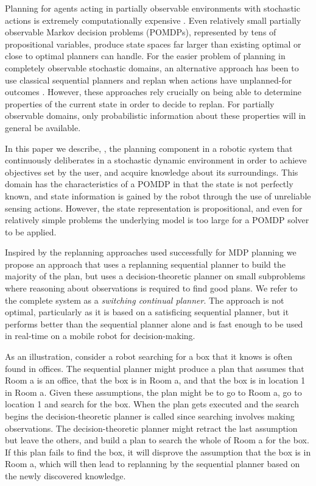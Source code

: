

Planning for agents acting in partially observable environments with
stochastic actions is extremely computationally
expensive \cite{mdp-complexity}. Even relatively small partially
observable Markov decision problems (POMDPs), represented by tens of
propositional variables, produce state spaces far larger than existing
optimal or close to optimal planners can handle. For the easier
problem of planning in completely observable stochastic domains, an
alternative approach has been to use classical sequential planners and
replan when actions have unplanned-for
outcomes \cite{yoon:etal:2007}. However, these approaches rely
crucially on being able to determine properties of the current state
in order to decide to replan. For partially observable domains, only
probabilistic information about these properties will in general be
available.

In this paper we describe, \pcogx, the planning component in a robotic
system that continuously deliberates in a stochastic dynamic
environment in order to achieve objectives set by the user, and
acquire knowledge about its surroundings. This domain has the
characteristics of a POMDP in that the state is not perfectly known,
and state information is gained by the robot through the use of
unreliable sensing actions. However, the state representation is
propositional, and even for relatively simple problems the underlying
model is too large for a POMDP solver to be applied.

Inspired by the replanning approaches used successfully for MDP
planning \cite{yoon:etal:2007,yoon:etal:2008} we propose an approach
that uses a replanning sequential planner to build the majority of the
plan, but uses a decision-theoretic planner on small subproblems where
reasoning about observations is required to find good plans. We refer
to the complete system as a {\em switching continual planner}. The
approach is not optimal, particularly as it is based on a satisficing
sequential planner, but it performs better than the sequential planner
alone and is fast enough to be used in real-time on a mobile robot for
decision-making. 

As an illustration, consider a robot searching for a box that it knows
is often found in offices. The sequential planner might produce a plan
that assumes that {\sc Room a} is an office, that the box is in {\sc
Room a}, and that the box is in location 1 in {\sc Room a}. Given
these assumptions, the plan might be to go to {\sc Room a}, go to
location 1 and search for the box. When the plan gets executed and the
search begins the decision-theoretic planner is called since searching
involves making observations. The decision-theoretic planner might
retract the last assumption but leave the others, and build a plan to
search the whole of {\sc Room a} for the box. If this plan fails to
find the box, it will disprove the assumption that the box is in {\sc
Room a}, which will then lead to replanning by the sequential planner
based on the newly discovered knowledge.

